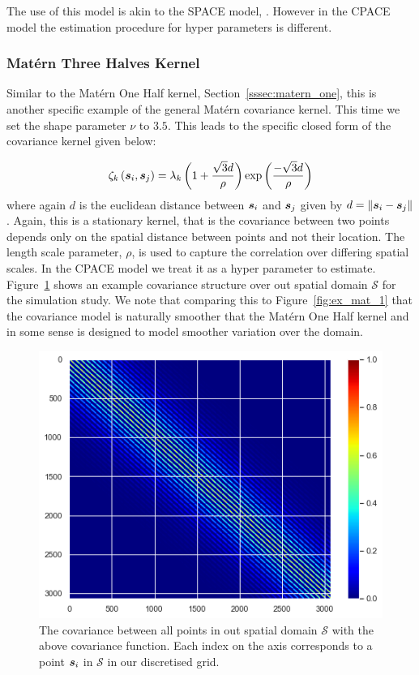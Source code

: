 The use of this model is akin to the SPACE model, \citep{liu_functional_2017}.
However in the CPACE model the estimation procedure for hyper parameters is different.

\subsubsection{Mat\'ern Three Halves Kernel \label{sssec:matern_three}}
Similar to the Mat\'ern One Half kernel, Section~\ref{sssec:matern_one}, this is another specific example of the general Mat\'ern covariance kernel.
This time we set the shape parameter $\nu$ to $3.5$.
This leads to the specific closed form of the covariance kernel given below:

\begin{equation}
	\zeta_k \left(\bm{{s}}_{i}, \bm{{s}}_{j}\right) = \lambda_k \left(1 + \frac{\sqrt{3}d}{\rho} \right)\exp \left(\frac{- \sqrt{3}d}{\rho} \right)
\end{equation}
where again $d$ is the euclidean distance between $\bm{{s}}_{i}$ and $\bm{{s}}_{j}$ given by $d = \lVert \bm{{s}}_{i} - \bm{{s}}_{j} \rVert$. 
Again, this is a stationary kernel, that is the covariance between two points depends only on the spatial distance between points and not their location.
The length scale parameter, $\rho$, is used to capture the correlation over differing spatial scales. 
In the CPACE model we treat it as a hyper parameter to estimate.
Figure~\ref{fig:ex_mat_3} shows an example covariance structure over out spatial domain $\mathcal{S}$ for the simulation study.
We note that comparing this to Figure~\ref{fig:ex_mat_1} that the covariance model is naturally smoother that the Mat\'ern One Half kernel and in some sense is designed to model smoother variation over the domain.

\begin{figure}
	\centering
	\includegraphics[width=\textwidth]{ex_mat_3}
	\caption{The covariance between all points in out spatial domain $\mathcal{S}$ with the above covariance function. Each index on the axis corresponds to a point $\bm{{s}}_i$ in $\mathcal{S}$ in our discretised grid.}
	\label{fig:ex_mat_3}
\end{figure}

